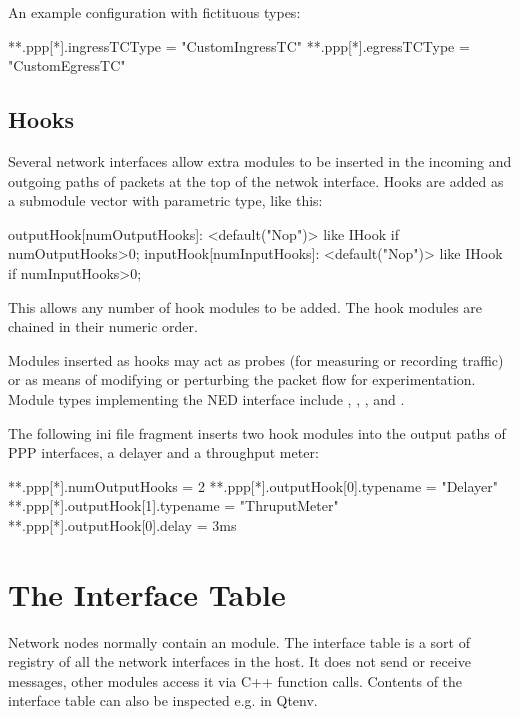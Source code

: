 An example configuration with fictituous types:

\begin{inifile}
**.ppp[*].ingressTCType = "CustomIngressTC"
**.ppp[*].egressTCType = "CustomEgressTC"
\end{inifile}


\subsection{Hooks}

Several network interfaces allow extra modules to be inserted in the incoming
and outgoing paths of packets at the top of the netwok interface. 
Hooks are added as a submodule vector with parametric type, like this: 

\begin{ned}
outputHook[numOutputHooks]: <default("Nop")> like IHook if numOutputHooks>0;
inputHook[numInputHooks]: <default("Nop")> like IHook if numInputHooks>0;
\end{ned}

This allows any number of hook modules to be added. The hook modules 
are chained in their numeric order.

Modules inserted as hooks may act as probes (for measuring or recording
traffic) or as means of modifying or perturbing the packet flow for 
experimentation. Module types implementing the  NED interface
include , , ,
and . 

The following ini file fragment inserts two hook modules into the output
paths of PPP interfaces, a delayer and a throughput meter:

\begin{inifile}
**.ppp[*].numOutputHooks = 2
**.ppp[*].outputHook[0].typename = "Delayer"
**.ppp[*].outputHook[1].typename = "ThruputMeter"
**.ppp[*].outputHook[0].delay = 3ms
\end{inifile}



\section{The Interface Table}

Network nodes normally contain an  module.
The interface table is a sort of registry of all the network interfaces
in the host. It does not send or receive messages, other modules access it
via C++ function calls. Contents of the interface table can also
be inspected e.g. in Qtenv.

